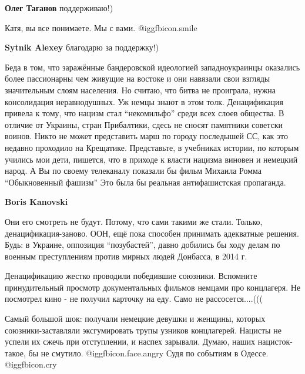 \begin{itemize}
\begin{itemize} %
\textbf{Олег Таганов} поддерживаю!)
\end{itemize} %


Катя, вы все понимаете. Мы с вами.  @igg{fbicon.smile} 

\textbf{Sytnik Alexey} благодарю за поддержку!)


Беда в том, что заражённые бандеровской идеологией западноукраинцы оказались
более пассионарны чем живущие на востоке и они навязали свои взгляды
значительным слоям населения. Но считаю, что битва не проиграла, нужна
консолидация неравнодушных. Уж немцы знают в этом толк. Денацификация привела к
тому, что нацизм стал \enquote{некомильфо} среди всех слоев общества. В отличие от
Украины, стран Прибалтики, сдесь не сносят памятники советски воинов. Никто не
может представить марш по городу последышей СС, как это недавно проходило на
Крещатике. Представьте, в учебниках истории, по которым учились мои дети,
пишется, что в приходе к власти нацизма виновен и немецкий народ. А Вы по
своему телеканалу показали бы фильм Михаила Ромма \enquote{Обыкновенный фашизм} Это
была бы реальная антифашистская пропаганда.

\begin{itemize} %
\textbf{Boris Kanovski} 

Они его смотреть не будут. Потому, что сами такими же стали. Только,
денацификация-заново. ООН, ещё пока способен принимать адекватные решения. Будь: в
Украине, оппозиция \enquote{позубастей}, давно добились бы ходу делам по военным
преступлениям против мирных людей Донбасса, в 2014 г.


Денацификацию жестко проводили победившие союзники. Вспомните принудительный
просмотр документальных фильмов немцами про концлагеря. Не посмотрел кино - не
получил карточку на еду. Само не рассосется....(((


Самый большой шок: получали немецкие девушки и женщины, которых
союзники-заставляли эксгумировать трупы узников концлагерей. Нацисты не успели
их сжечь при отступлении, и наспех зарывали. Думаю, наших нацисток-такое, бы не
смутило. @igg{fbicon.face.angry} Судя по событиям в Одессе. @igg{fbicon.cry} 


\end{itemize}
\end{itemize}
